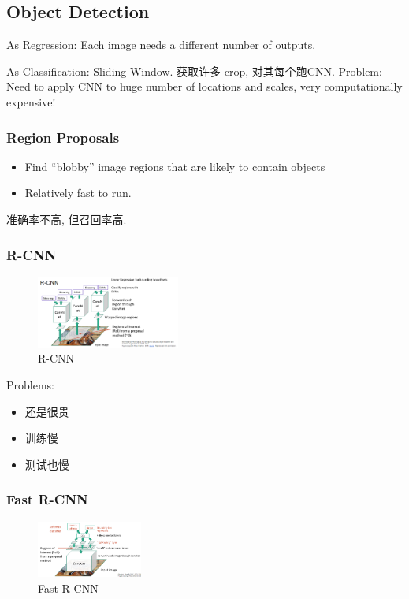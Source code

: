 \subsection{Object Detection}
As Regression: Each image needs a different number of outputs. 

As Classification: Sliding Window. 获取许多 crop, 对其每个跑CNN. 
Problem: Need to apply CNN to huge number of locations and scales, very computationally expensive!

\subsubsection{Region Proposals}
\begin{itemize}
    \item Find ``blobby'' image regions that are likely to contain objects
    \item Relatively fast to run. 
\end{itemize}
准确率不高, 但召回率高. 

\subsubsection{R-CNN}
\begin{figure}[!htb]
    \centering
    \includegraphics[width=0.42\textwidth]{pic/lec11/R-CNN}
    \caption{R-CNN}
\end{figure}

Problems: 
\begin{itemize}
    \item 还是很贵
    \item 训练慢
    \item 测试也慢
\end{itemize}

\subsubsection{Fast R-CNN}
\begin{figure}[!htb]
    \centering
    \includegraphics[width=0.309\textwidth]{pic/Lec11/Fast R-CNN}
    \caption{Fast R-CNN}
\end{figure}

